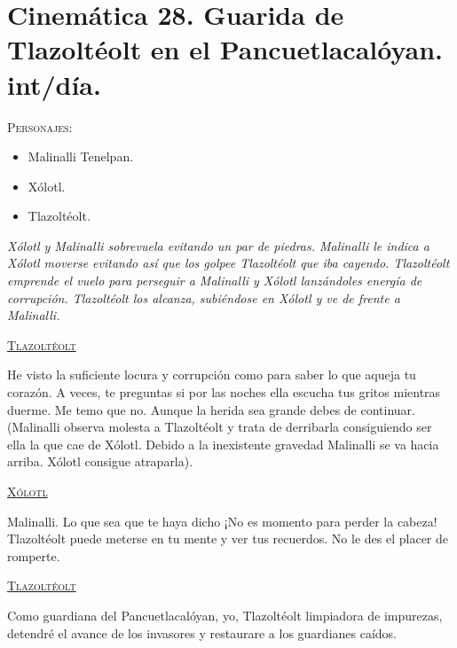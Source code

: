 \documentclass[11pt,letterpaper]{article}
\begin{document}
\section{Cinemática 28. Guarida de Tlazoltéolt en el Pancuetlacalóyan. int/día.}
 \textsc{Personajes}:
 \begin{itemize}
 \item Malinalli Tenelpan.
\item Xólotl.
\item Tlazoltéolt.
 \end{itemize}
\textit{Xólotl y Malinalli sobrevuela evitando un par de piedras. Malinalli le indica a Xólotl moverse evitando así que los golpee Tlazoltéolt que iba cayendo. Tlazoltéolt emprende el vuelo para perseguir a Malinalli y Xólotl lanzándoles energía de corrupción. Tlazoltéolt los alcanza, subiéndose en Xólotl y ve de frente a Malinalli.}
\begin{center}
\textsc{\underline{Tlazoltéolt}}
\\
\par
He visto la suficiente locura y corrupción como para saber lo que aqueja tu corazón. A veces, te preguntas si por las noches ella escucha tus gritos mientras duerme. Me temo que no. Aunque la herida sea grande debes de continuar. (Malinalli observa molesta a Tlazoltéolt y trata de derribarla consiguiendo ser ella la que cae de Xólotl. Debido a la inexistente gravedad Malinalli se va hacia arriba. Xólotl consigue atraparla). 
\\
\par
\textsc{\underline{Xólotl}}
\\
\par
Malinalli. Lo que sea que te haya dicho ¡No es momento para perder la cabeza! Tlazoltéolt puede meterse en tu mente y ver tus recuerdos. No le des el placer de romperte.
\\
\par
\textsc{\underline{Tlazoltéolt}}
\\
\par
Como guardiana del Pancuetlacalóyan, yo, Tlazoltéolt limpiadora de impurezas, detendré el avance de los invasores y restaurare a los guardianes caídos.
\end{center}
\end{document}

